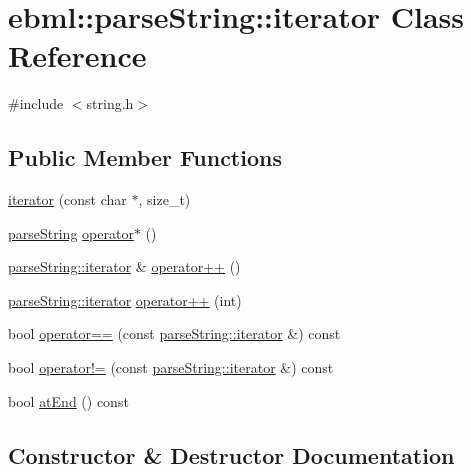 \hypertarget{classebml_1_1parseString_1_1iterator}{}\section{ebml\+:\+:parse\+String\+:\+:iterator Class Reference}
\label{classebml_1_1parseString_1_1iterator}


{\ttfamily \#include $<$string.\+h$>$}

\subsection*{Public Member Functions}
\begin{DoxyCompactItemize}
\item 
\mbox{\hyperlink{classebml_1_1parseString_1_1iterator_ab73280633b366afd2a53b689610585d9}{iterator}} (const char $\ast$, size\+\_\+t)
\item 
\mbox{\hyperlink{classebml_1_1parseString}{parse\+String}} \mbox{\hyperlink{classebml_1_1parseString_1_1iterator_abe2e504da9045240539efe00476f3bd0}{operator$\ast$}} ()
\item 
\mbox{\hyperlink{classebml_1_1parseString_1_1iterator}{parse\+String\+::iterator}} \& \mbox{\hyperlink{classebml_1_1parseString_1_1iterator_a289693cc2c25e4f0e24fbe51d0d59736}{operator++}} ()
\item 
\mbox{\hyperlink{classebml_1_1parseString_1_1iterator}{parse\+String\+::iterator}} \mbox{\hyperlink{classebml_1_1parseString_1_1iterator_a23a43b9b25bc3c9246aee8c89eac3f71}{operator++}} (int)
\item 
bool \mbox{\hyperlink{classebml_1_1parseString_1_1iterator_a6dd6eff768ec3385b2981d6861834056}{operator==}} (const \mbox{\hyperlink{classebml_1_1parseString_1_1iterator}{parse\+String\+::iterator}} \&) const
\item 
bool \mbox{\hyperlink{classebml_1_1parseString_1_1iterator_a2f93ead5c4fd4b6a84a269ba49432c4c}{operator!=}} (const \mbox{\hyperlink{classebml_1_1parseString_1_1iterator}{parse\+String\+::iterator}} \&) const
\item 
bool \mbox{\hyperlink{classebml_1_1parseString_1_1iterator_a9f929d744bd65be4508ac9403ed1f998}{at\+End}} () const
\end{DoxyCompactItemize}


\subsection{Constructor \& Destructor Documentation}
\mbox{\label{classebml_1_1parseString_1_1iterator_ab73280633b366afd2a53b689610585d9}} 
